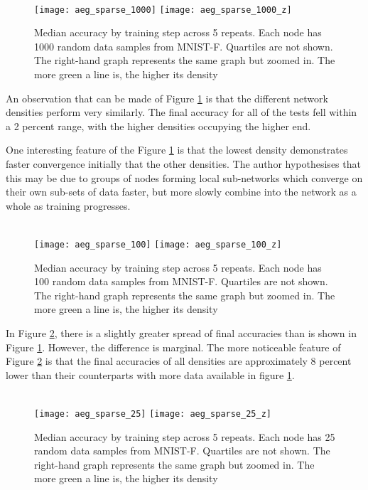 \begin{figure}[H] 
	 \\
	\texttt{[image: aeg\_sparse\_1000]}
	\texttt{[image: aeg\_sparse\_1000\_z]}
	\caption{Median accuracy by training step across 5 repeats. Each node has 1000 random data samples from MNIST-F. Quartiles are not shown. The right-hand graph represents the same graph but zoomed in. The more green a line is, the higher its density}
	\label{aeg4}
\end{figure}

An observation that can be made of Figure \ref{aeg4} is that the different network densities perform very similarly. The final accuracy for all of the tests fell within a 2 percent range,  with the higher densities occupying the higher end.

One interesting feature of the Figure \ref{aeg4} is that the lowest density demonstrates faster convergence initially that the other densities. The author hypothesises that this may be due to groups of nodes forming local sub-networks which converge on their own sub-sets of data faster, but more slowly combine into the network as a whole as training progresses.

\begin{figure}[H] 
	 \\
	\texttt{[image: aeg\_sparse\_100]}
	\texttt{[image: aeg\_sparse\_100\_z]}
	\caption{Median accuracy by training step across 5 repeats. Each node has 100 random data samples from MNIST-F. Quartiles are not shown. The right-hand graph represents the same graph but zoomed in. The more green a line is, the higher its density}
	\label{aeg5}
\end{figure}

In Figure \ref{aeg5}, there is a slightly greater spread of final accuracies than is shown in Figure \ref{aeg4}. However, the difference is marginal. The more noticeable feature of Figure \ref{aeg5} is that the final accuracies of all densities are approximately 8 percent lower than their counterparts with more data available in figure \ref{aeg4}.

\begin{figure}[H] 
	 \\
	\texttt{[image: aeg\_sparse\_25]}
	\texttt{[image: aeg\_sparse\_25\_z]}
	\caption{Median accuracy by training step across 5 repeats. Each node has 25 random data samples from MNIST-F. Quartiles are not shown. The right-hand graph represents the same graph but zoomed in. The more green a line is, the higher its density}
	\label{aeg6}
\end{figure}


